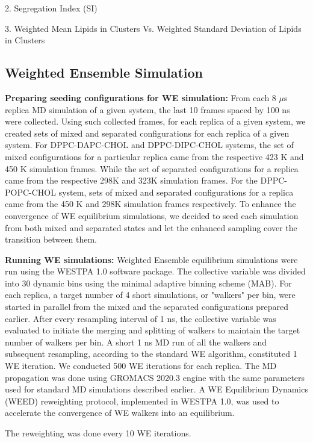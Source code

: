 \documentclass{biophys-new}
\begin{document}
2. Segregation Index (SI)

3. Weighted Mean Lipids in Clusters Vs. Weighted Standard Deviation of Lipids in Clusters

\subsection*{Weighted Ensemble Simulation}

\textbf{Preparing seeding configurations for WE simulation:} 
From each 8 $\mu$s replica MD simulation of a given system, the last 10 frames spaced by 100 ns were collected.
Using such collected frames, for each replica of a given system, we created sets of mixed and separated configurations for each replica of a given system.
For DPPC-DAPC-CHOL and DPPC-DIPC-CHOL systems, the set of mixed configurations for a particular replica came from the respective 423 K and 450 K simulation frames. 
While the set of separated configurations for a replica came from  the respective 298K and 323K simulation frames.
For the DPPC-POPC-CHOL system, sets of mixed and separated configurations for a replica came from the 450 K and 298K simulation frames respectively.
To enhance the convergence of WE equilibrium simulations, we decided to seed each simulation from both mixed and separated states and let the enhanced sampling cover the transition between them.

\textbf{Running WE simulations:} 
Weighted Ensemble equilibrium simulations were run using the WESTPA 1.0 software package.
The collective variable was divided into 30 dynamic bins using the minimal adaptive binning scheme (MAB).
For each replica, a target number of 4 short simulations, or "walkers" per bin, were started in parallel from the mixed and the separated configurations prepared earlier.
After every resampling interval of 1 ns, the collective variable was evaluated to initiate the merging and splitting of walkers to maintain the target number of walkers per bin.
A short 1 ns MD run of all the walkers and subsequent resampling, according to the standard WE algorithm, constituted 1 WE iteration. 
We conducted 500 WE iterations for each replica.
The MD propagation was done using GROMACS 2020.3 engine with the same parameters used for standard MD simulations described earlier.
A WE Equilibrium Dynamics (WEED) reweighting protocol, implemented in WESTPA 1.0, was used to accelerate the convergence of WE walkers into an equilibrium. 

The reweighting was done every 10 WE iterations.
\end{document}

